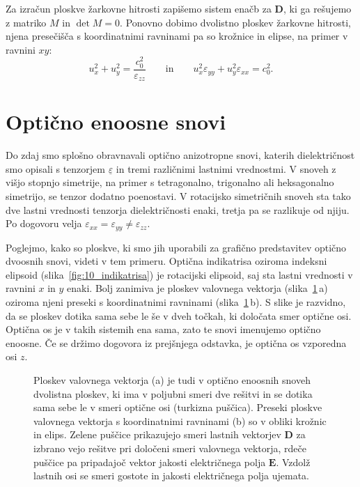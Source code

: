 \begin{remark}
Za izračun ploskve žarkovne hitrosti zapišemo sistem enačb za $\mathbf{D}$, ki ga rešujemo z matriko 
$M$ in $\det M =0$. Ponovno dobimo dvolistno ploskev žarkovne hitrosti, njena 
presečišča s koordinatnimi ravninami pa so krožnice in elipse, na primer v ravnini $xy$:
\begin{equation}
u_x^2+u_y^2 = \frac{c_0^2}{\varepsilon_{zz}}\qquad \mathrm{in}\qquad 
u_x^2 \varepsilon_{yy} +u_y^2 \varepsilon_{xx} = c_0^2.
\label{eq:10_099}
\end{equation}
\end{remark}

\section{Optično enoosne snovi}
Do zdaj smo splošno obravnavali optično anizotropne snovi, katerih dielektričnost
smo opisali s tenzorjem $\underline{\varepsilon}$ in tremi različnimi lastnimi vrednostmi. 
V snoveh z višjo stopnjo simetrije, na primer s tetragonalno, trigonalno ali heksagonalno
simetrijo, se tenzor dodatno poenostavi. V rotacijsko simetričnih snoveh sta tako dve lastni 
vrednosti tenzorja dielektričnosti enaki, tretja pa se razlikuje od njiju.
Po dogovoru velja $\varepsilon_{xx} = \varepsilon_{yy}\neq \varepsilon_{zz}$.

Poglejmo, kako so ploskve, ki smo jih uporabili za grafično predstavitev optično
dvoosnih snovi, videti v tem primeru. Optična indikatrisa oziroma indeksni elipsoid 
(slika~\ref{fig:10_indikatrisa}) je rotacijski elipsoid, saj sta lastni vrednosti
v ravnini $x$ in $y$ enaki. Bolj zanimiva je ploskev valovnega vektorja
(slika~\ref{fig:10_ploskev_3D_eno}\,a)
oziroma njeni preseki s koordinatnimi ravninami (slika~\ref{fig:10_ploskev_3D_eno}\,b). 
S slike je razvidno, da se ploskev dotika sama sebe le še v dveh točkah, ki določata 
smer optične osi. Optična os je v takih sistemih ena sama, zato te snovi imenujemo optično 
enoosne. Če se držimo dogovora iz prejšnjega odstavka, je optična os vzporedna osi $z$.
\begin{figure}[ht]
\centering
\def\svgwidth{130truemm} 

\caption{Ploskev valovnega vektorja (a) je tudi v optično enoosnih snoveh dvolistna ploskev, 
ki ima v poljubni smeri dve rešitvi in se dotika sama sebe le v smeri optične osi 
(turkizna puščica). Preseki ploskve valovnega vektorja
s koordinatnimi ravninami (b) so v obliki krožnic in elips.
Zelene puščice prikazujejo smeri lastnih vektorjev $\mathbf{D}$ za izbrano vejo rešitve pri 
določeni smeri valovnega vektorja, rdeče puščice pa pripadajoč vektor jakosti električnega polja 
$\mathbf{E}$. Vzdolž lastnih osi se smeri gostote in jakosti električnega polja ujemata.}
\label{fig:10_ploskev_3D_eno}
\end{figure}

